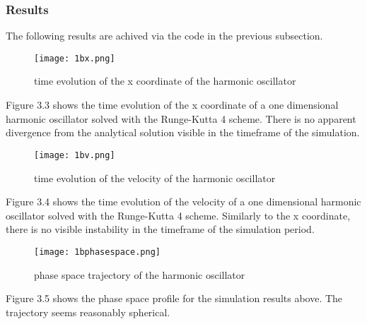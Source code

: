 \documentclass[12pt,a4paper]{article}	%
\begin{document}
\subsubsection*{Results}
The following results are achived via the code in the previous subsection. 
\begin{figure}[h!]		
\centering
{\texttt{[image: 1bx.png]}}		
\caption{time evolution of the x coordinate of the harmonic oscillator}
\end{figure}

Figure 3.3 shows the time evolution of the x coordinate of a one dimensional harmonic oscillator solved with the Runge-Kutta 4 scheme. There is no apparent divergence from the analytical solution visible in the timeframe of the simulation.



\begin{figure}[h!]		
\centering
{\texttt{[image: 1bv.png]}}		
\caption{time evolution of the velocity of the harmonic oscillator}
\end{figure}

Figure 3.4 shows the time evolution of the velocity of a one dimensional harmonic oscillator solved with the Runge-Kutta 4 scheme. Similarly to the x coordinate, there is no visible instability in the timeframe of the simulation period. 

\newpage

\begin{figure}[h!]		
\centering
{\texttt{[image: 1bphasespace.png]}}		
\caption{phase space trajectory of the harmonic oscillator}
\end{figure}

Figure 3.5 shows the phase space profile for the simulation results above. The trajectory seems reasonably spherical. 
\end{document}
